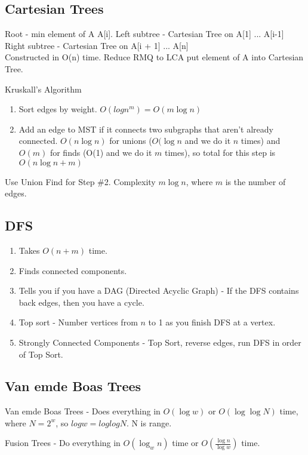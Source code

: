 \documentclass[7pt,twocolumn]{article}
\begin{document}
\subsection{Cartesian Trees}
Root - min element of A A[i].  Left subtree - Cartesian Tree on A[1] ... A[i-1]
Right subtree - Cartesian Tree on A[i + 1] ... A[n]\\
Constructed in O(n) time.
Reduce RMQ to LCA put element of A into Cartesian Tree.



Kruskall's Algorithm
\begin{enumerate}
    \item Sort edges by weight. $O(logn^m) = O(m\log{n})$
    \item Add an edge to MST if it connects two subgraphs that aren't already connected. $O(n\log{n})$ for
        unions ($O(\log{n}$ and we do it $n$ times) and $O(m)$ for finds (O(1) and we do it $m$ times), so total for this step is $O(n\log{n}+m)$
\end{enumerate}

Use Union Find for Step \#2. Complexity $m \log n$, where $m$ is the number of edges.

\subsection{DFS}
\begin{enumerate}
    \item Takes $O(n+m)$ time.
    \item Finds connected components.
    \item Tells you if you have a DAG (Directed Acyclic Graph) - If the DFS contains back edges, then you have a cycle.
    \item Top sort - Number vertices from $n$ to 1 as you finish DFS at a vertex.
    \item Strongly Connected Components - Top Sort, reverse edges, run DFS in order of Top Sort.
\end{enumerate}

\subsection{Van emde Boas Trees}

Van emde Boas Trees - Does everything in $O(\log w)$ or $O(\log \log N)$ time,
where $N = 2^w$, so $logw = loglogN$. N is range.

Fusion Trees - Do everything in $O(\log_{w}{n})$ time or $O(\frac{\log{n}}{\log{w}})$ time.
\end{document}
